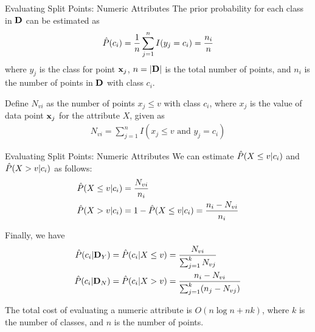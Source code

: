 \begin{frame}{Evaluating Split Points: Numeric Attributes}
\small
The prior probability for each class in $\mathbf{D}$ can be estimated as
\begin{align*}
    \hat{P}(c_i) = {1 \over n} \sum_{j=1}^n I(y_{j}=c_i) =
    {n_i \over n}
\end{align*}
where $y_{j}$ is the class for point $\mathbf{x}_{j}$,
$n = |\mathbf{D}|$ is the total number of points, and $n_i$ is
the number of points in $\mathbf{D}$ with class $c_i$.

\medskip
Def\/{i}ne $N_{vi}$ as
the number of points $x_{j} \le v$ with
class $c_i$,
where $x_{j}$ is the value of data point $\mathbf{x}_{j}$
for the attribute $X$, given as
\begin{align*}
N_{vi} = \sum_{j=1}^n I(x_{j} \le v \text{ and } y_{j}=c_i)
\end{align*}
\end{frame}

\begin{frame}{Evaluating Split Points: Numeric Attributes}
We can estimate  $\hat{P}(X \le v|c_i)$ and $\hat{P}(X > v | c_i)$ as follows:
\begin{align*}
    \hat{P}(X \le v| c_i) & = {N_{vi} \over n_i}\\
  \hat{P}(X > v|c_i) & = 1 - \hat{P}(X \le v | c_i) =
	  {n_i - N_{vi} \over n_i}
\end{align*}

\medskip
Finally, we have
\begin{align*}
  \hat{P}(c_i | \mathbf{D}_Y) & = \hat{P}(c_i | X \le v) = {N_{vi} \over \sum_{j=1}^k
  N_{vj}}\\
    \hat{P}(c_i | \mathbf{D}_N)  & =
    \hat{P}(c_i | X > v) = 
    {n_i - N_{vi} \over \sum_{j=1}^k (n_{j} - N_{vj})}
\end{align*}

The total cost of evaluating a
numeric attribute is $O(n \log n + nk)$, where $k$ is the number of
classes, and $n$ is the number of points.
\end{frame}


